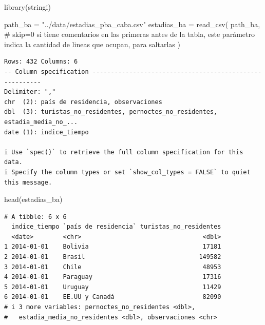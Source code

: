 \documentclass[
  spanish,
  letterpaper,
  DIV=11,
  numbers=noendperiod]{scrartcl}
\newenvironment{Shaded}{\begin{snugshade}}{\end{snugshade}}
\newcommand{\CommentTok}[1]{\textcolor[rgb]{0.37,0.37,0.37}{#1}}
\newcommand{\FunctionTok}[1]{\textcolor[rgb]{0.28,0.35,0.67}{#1}}
\newcommand{\NormalTok}[1]{\textcolor[rgb]{0.00,0.23,0.31}{#1}}
\newcommand{\OtherTok}[1]{\textcolor[rgb]{0.00,0.23,0.31}{#1}}
\newcommand{\StringTok}[1]{\textcolor[rgb]{0.13,0.47,0.30}{#1}}
\begin{document}
\begin{Shaded}
\begin{Highlighting}[]
\FunctionTok{library}\NormalTok{(stringi)}
\end{Highlighting}
\end{Shaded}

\begin{Shaded}
\begin{Highlighting}[]
\NormalTok{path\_ba }\OtherTok{=} \StringTok{"../data/estadias\_pba\_caba.csv"}
\NormalTok{estadias\_ba }\OtherTok{=} \FunctionTok{read\_csv}\NormalTok{(}
\NormalTok{  path\_ba, }
  \CommentTok{\# skip=0 si tiene comentarios en las primeras antes de la tabla, este parámetro  indica la cantidad de lineas que ocupan, para saltarlas}
\NormalTok{  )}
\end{Highlighting}
\end{Shaded}

\begin{verbatim}
Rows: 432 Columns: 6
-- Column specification --------------------------------------------------------
Delimiter: ","
chr  (2): país de residencia, observaciones
dbl  (3): turistas_no_residentes, pernoctes_no_residentes, estadia_media_no_...
date (1): indice_tiempo

i Use `spec()` to retrieve the full column specification for this data.
i Specify the column types or set `show_col_types = FALSE` to quiet this message.
\end{verbatim}

\begin{Shaded}
\begin{Highlighting}[]
\FunctionTok{head}\NormalTok{(estadias\_ba)}
\end{Highlighting}
\end{Shaded}

\begin{verbatim}
# A tibble: 6 x 6
  indice_tiempo `país de residencia` turistas_no_residentes
  <date>        <chr>                                 <dbl>
1 2014-01-01    Bolivia                               17181
2 2014-01-01    Brasil                               149582
3 2014-01-01    Chile                                 48953
4 2014-01-01    Paraguay                              17316
5 2014-01-01    Uruguay                               11429
6 2014-01-01    EE.UU y Canadá                        82090
# i 3 more variables: pernoctes_no_residentes <dbl>,
#   estadia_media_no_residentes <dbl>, observaciones <chr>
\end{verbatim}
\end{document}
